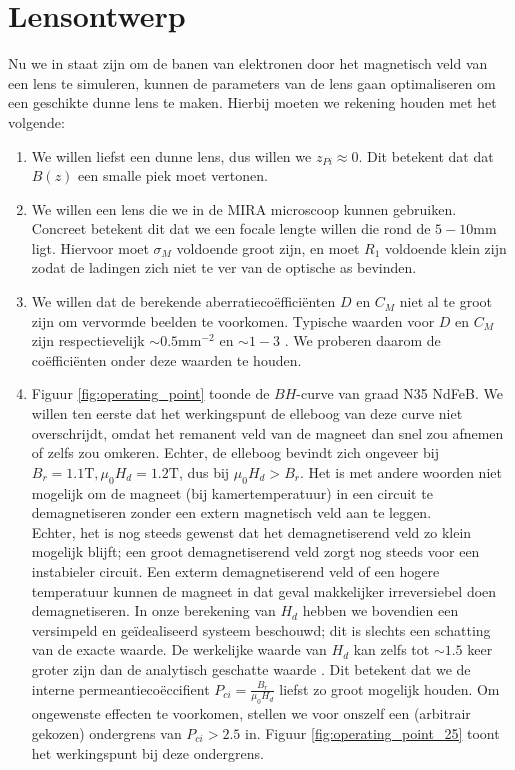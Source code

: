 \documentclass[we,twoside,openright,a4paper,11pt]{uantwerpenbamathesis}
\begin{document}
\section{Lensontwerp}\label{ch:lensontwerp}
Nu we in staat zijn om de banen van elektronen door het magnetisch veld van een lens te simuleren, kunnen de parameters van de lens gaan optimaliseren om een geschikte dunne lens te maken. Hierbij moeten we rekening houden met het volgende:
\begin{enumerate}
    \item We willen liefst een dunne lens, dus willen we $z_{Pi}\approx0$. Dit betekent dat dat $B(z)$ een smalle piek moet vertonen.

    \item We willen een lens die we in de MIRA microscoop kunnen gebruiken. Concreet betekent dit dat we een focale lengte willen die rond de $5-10\mathrm{mm}$ ligt. Hiervoor moet $\sigma_M$ voldoende groot zijn, en moet $R_1$ voldoende klein zijn zodat de ladingen zich niet te ver van de optische as bevinden.
    
    \item We willen dat de berekende aberratiecoëfficiënten $D$ en $C_M$ niet al te groot zijn om vervormde beelden te voorkomen. Typische waarden voor $D$ en $C_M$ zijn respectievelijk $\sim0.5\mathrm{mm}^{-2}$ en $\sim1-3$ \cite{Abbas_2016} \cite{JEOL_Aberrations}. We proberen daarom de coëfficiënten onder deze waarden te houden.

    \item Figuur \ref{fig:operating_point} toonde de $BH$-curve van graad N35 NdFeB. We willen ten eerste dat het werkingspunt de elleboog van deze curve niet overschrijdt, omdat het remanent veld van de magneet dan snel zou afnemen of zelfs zou omkeren. Echter, de elleboog bevindt zich ongeveer bij $B_r=1.1\mathrm{T}, \mu_0 H_d = 1.2\mathrm{T}$, dus bij $\mu_0 H_d>B_r$. Het is met andere woorden niet mogelijk om de magneet (bij kamertemperatuur) in een circuit te demagnetiseren zonder een extern magnetisch veld aan te leggen.\\

    Echter, het is nog steeds gewenst dat het demagnetiserend veld zo klein mogelijk blijft; een groot demagnetiserend veld zorgt nog steeds voor een instabieler circuit. Een exterm demagnetiserend veld of een hogere temperatuur kunnen de magneet in dat geval makkelijker irreversiebel doen demagnetiseren. In onze berekening van $H_d$ hebben we bovendien een versimpeld en geïdealiseerd systeem beschouwd; dit is slechts een schatting van de exacte waarde. De werkelijke waarde van $H_d$ kan zelfs tot $\sim1.5$ keer groter zijn dan de analytisch geschatte waarde \cite{MagnetFAQ}. Dit betekent dat we de interne permeantiecoëccifient $P_{ci}=\frac{B_r}{\mu_0 H_d}$ liefst zo groot mogelijk houden. Om ongewenste effecten te voorkomen, stellen we voor onszelf een (arbitrair gekozen) ondergrens van $P_{ci}>2.5$ in. Figuur \ref{fig:operating_point_25} toont het werkingspunt bij deze ondergrens.


\end{enumerate}
\end{document}
